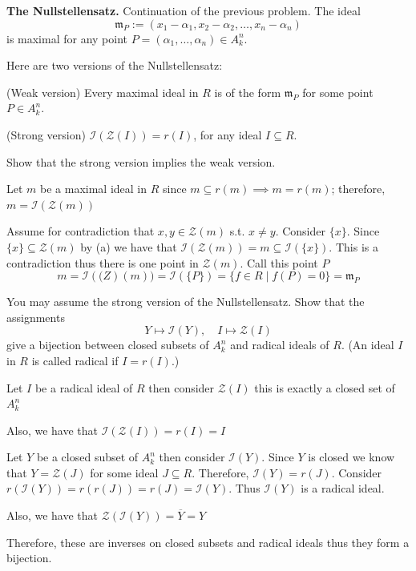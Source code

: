 \documentclass[12pt, letterpaper]{article}
\begin{document}
\begin{problem}{}
    {\bf The Nullstellensatz.} Continuation of the previous problem.
    The ideal
    \[
    \mathfrak{m}_P := (x_1 - \alpha_1, x_2 -\alpha_2, \ldots, x_n -\alpha_n)
    \]
    is maximal for any point $P=(\alpha_1, \ldots, \alpha_n) \in A^n_k$. 
    
    Here are two versions of the Nullstellensatz:

    (Weak version) Every maximal ideal in $R$ is of the form $\mathfrak{m}_P$ for some point $P \in A^n_k$. 

    (Strong version) $ \mathcal{I} (\mathcal{Z} (I)) = r(I)$, for any ideal $I\subseteq R$.
\end{problem}

\begin{subproblem}{}
    Show that the strong version implies the weak version.
\end{subproblem}
\begin{problemproof}
    Let $m$ be a maximal ideal in $R$ since $m \subseteq r(m) \implies m=r(m)$; therefore, $m=\mathcal{I}(\mathcal{Z}(m))$
    
    Assume for contradiction that $x,y \in \mathcal{Z}(m)$ s.t. $x \neq y$. Consider $\{x\}$. Since $\{x\} \subseteq \mathcal{Z}(m)$ by (a) we have that $\mathcal{I}(\mathcal{Z}(m))=m \subseteq \mathcal{I}(\{x\})$. This is a contradiction thus there is one point in $\mathcal{Z}(m)$. Call this point $P$
    \[m=\mathcal{I}(\mathcal(Z)(m))=\mathcal{I}(\{P\})=\{f \in R \mid f(P)=0\}=\mathfrak{m}_P\]
\end{problemproof}

\begin{subproblem}{}
    You may assume the strong version of the Nullstellensatz. Show that the assignments 
    \[
    Y \mapsto \mathcal{I} (Y), \quad I \mapsto \mathcal{Z}(I)
    \]
    give a bijection between closed subsets of $A^n_k$ and radical ideals of $R$. (An ideal $I$ in $R$ is called radical if $I=r(I)$.)
\end{subproblem}
\begin{problemproof}
    Let $I$ be a radical ideal of $R$ then consider $\mathcal{Z}(I)$ this is exactly a closed set of $A_k^n$
    
    Also, we have that $\mathcal{I}(\mathcal{Z}(I))=r(I)=I$
    
    Let $Y$ be a closed subset of $A_k^n$ then consider $\mathcal{I}(Y)$. Since $Y$ is closed we know that $Y=\mathcal{Z}(J)$ for some ideal $J \subseteq R$. Therefore, $\mathcal{I}(Y)=r(J)$. Consider $r(\mathcal{I}(Y))=r(r(J))=r(J)=\mathcal{I}(Y)$. Thus $\mathcal{I}(Y)$ is a radical ideal.
    
    Also, we have that $\mathcal{Z}(\mathcal{I}(Y))=\overline{Y}=Y$ 
    
    Therefore, these are inverses on closed subsets and radical ideals thus they form a bijection.
\end{problemproof}
\end{document}
